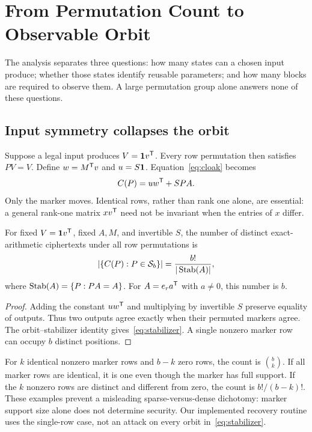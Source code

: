 \section{From Permutation Count to Observable Orbit}
\label{sec:analysis}
The analysis separates three questions: how many states can a chosen input produce; whether those states identify reusable parameters; and how many blocks are required to observe them. A large permutation group alone answers none of these questions.

\subsection{Input symmetry collapses the orbit}
Suppose a legal input produces $V=\mathbf{1} v^{\mathsf{T}}$. Every row permutation then satisfies $PV=V$. Define $w=M^{\mathsf{T}} v$ and $u=S\mathbf{1}$. Equation~\eqref{eq:cloak} becomes
\begin{equation}
 C(P)=u w^{\mathsf{T}}+S P A.
 \label{eq:orbit}
\end{equation}
Only the marker moves. Identical rows, rather than rank one alone, are essential: a general rank-one matrix $xv^{\mathsf{T}}$ need not be invariant when the entries of $x$ differ.

\begin{proposition}
For fixed $V=\mathbf{1} v^{\mathsf{T}}$, fixed $A,M$, and invertible $S$, the number of distinct exact-arithmetic ciphertexts under all row permutations is
\begin{equation}
 |\{C(P):P\in\mathcal S_b\}|=\frac{b!}{|\operatorname{Stab}(A)|},
 \label{eq:stabilizer}
\end{equation}
where $\operatorname{Stab}(A)=\{P:PA=A\}$. For $A=e_ra^{\mathsf{T}}$ with $a\ne0$, this number is $b$.
\end{proposition}
\begin{proof}
Adding the constant $uw^{\mathsf{T}}$ and multiplying by invertible $S$ preserve equality of outputs. Thus two outputs agree exactly when their permuted markers agree. The orbit--stabilizer identity gives~\eqref{eq:stabilizer}. A single nonzero marker row can occupy $b$ distinct positions.
\end{proof}

For $k$ identical nonzero marker rows and $b-k$ zero rows, the count is $\binom bk$. If all marker rows are identical, it is one even though the marker has full support. If the $k$ nonzero rows are distinct and different from zero, the count is $b!/(b-k)!$. These examples prevent a misleading sparse-versus-dense dichotomy: marker support size alone does not determine security. Our implemented recovery routine uses the single-row case, not an attack on every orbit in~\eqref{eq:stabilizer}.

